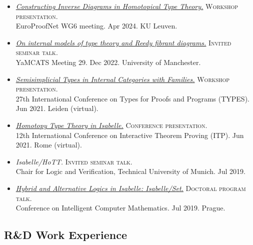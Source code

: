\documentclass[12pt,a4paper]{article}
\begin{document}
\begin{itemize}
\item
  \href{https://youtu.be/cB9hml8YBj4}{\emph{Constructing Inverse Diagrams in Homotopical Type Theory.}}
  \textsc{Workshop presentation.}\\
  EuroProofNet WG6 meeting.
  Apr 2024.
  KU Leuven.
\item
  \href{https://conferences.leeds.ac.uk/yamcats/meeting-29/}{\emph{On internal models of type theory and Reedy fibrant diagrams.}}
  \textsc{Invited seminar talk.}\\
  YaMCATS Meeting 29.
  Dec 2022.
  University of Manchester.
\item
  \href{https://joshchen.io/media/semisimplicial-types-in-internal-categories-with-families.mp4}{\emph{Semisimplicial Types in Internal Categories with Families.}}
  \textsc{Workshop presentation.}\\
  27th International Conference on Types for Proofs and Programs (TYPES).
  Jun 2021.
  Leiden (virtual).
\item
  \href{https://youtu.be/fGnIdt_jPfA?t=4630}{\emph{Homotopy Type Theory in Isabelle.}}
  \textsc{Conference presentation.}\\
  12th International Conference on Interactive Theorem Proving (ITP).
  Jun 2021.
  Rome (virtual).
\item
  \emph{Isabelle/HoTT.}
  \textsc{Invited seminar talk.}\\
  Chair for Logic and Verification, Technical University of Munich.
  Jul 2019.
\item
\href{https://joshchen.io/pdf/cicm-2019-slides.pdf}{\emph{Hybrid and Alternative Logics in Isabelle: Isabelle/Set.}}
  \textsc{Doctoral program talk.}\\
  Conference on Intelligent Computer Mathematics.
  Jul 2019.
  Prague.
\end{itemize}

\newpage

\subsection{R\&D Work Experience}\label{previous-work-research}
\end{document}

